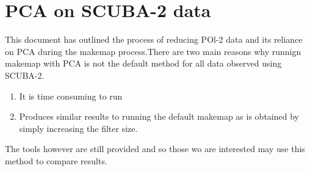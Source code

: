 \chapter{PCA on SCUBA-2 data}
\label{app:pca}

This document has outlined the process of reducing POl-2 data and its
reliance on PCA during the makemap process.There are two main reasons 
why runnign makemap with PCA is not the default method for all data observed
using SCUBA-2. 

\begin{enumerate}
\item It is time consuming to run
\item Produces similar results to running the default makemap as 
is obtained by simply increasing the filter size.
\end{enumerate}

The tools however are still provided and so those wo are interested
may use this method to compare results.
